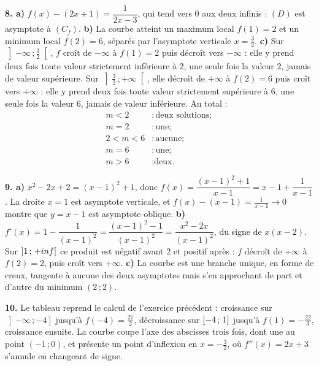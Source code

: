 \begin{corrige}[annales]
\textbf{8. a)} $f(x)-(2x+1) = \dfrac{1}{2x-3}$, qui tend vers $0$ aux deux
infinis : $(D)$ est asymptote à $(C_{f})$.
\textbf{b)} La courbe atteint un maximum local $f(1) = 2$ et un minimum local
$f(2) = 6$, séparés par l'asymptote verticale $x = \frac32$.
\textbf{c)} Sur $\left]-\infty\,;\frac32\right[$, $f$ croît de $-\infty$ à
$f(1) = 2$ puis décroît vers $-\infty$ : elle y prend deux fois toute valeur
strictement inférieure à $2$, une seule fois la valeur $2$, jamais de valeur
supérieure. Sur $\left]\frac32\,;+\infty\right[$, elle décroît de $+\infty$ à
$f(2) = 6$ puis croît vers $+\infty$ : elle y prend deux fois toute valeur
strictement supérieure à $6$, une seule fois la valeur $6$, jamais de valeur
inférieure. Au total :
\[\begin{aligned}
m<2 &: \text{deux solutions} ; \\
  m = 2 &: \text{une} ; \\
  2<m<6 &: \text{aucune} ; \\
  m = 6 &: \text{une} ; \\
  m>6 &: \text{deux.}
\end{aligned}\]

\textbf{9. a)} $x^{2}-2x+2 = (x-1)^{2}+1$, donc
$f(x) = \dfrac{(x-1)^{2}+1}{x-1} = x-1+\dfrac{1}{x-1}$. La droite $x = 1$ est
asymptote verticale, et $f(x)-(x-1) = \frac{1}{x-1}\to0$ montre que
$y = x-1$ est asymptote oblique.
\textbf{b)} $f'(x) = 1-\dfrac{1}{(x-1)^{2}} = \dfrac{(x-1)^{2}-1}{(x-1)^{2}}
= \dfrac{x^{2}-2x}{(x-1)^{2}}$, du signe de $x(x-2)$. Sur
$\left]1\,;\,+inf\right[$ ce produit est négatif avant $2$ et positif après :
$f$ décroît de $+\infty$ à $f(2) = 2$, puis croît vers $+\infty$.
\textbf{c)} La courbe est une branche unique, en forme de creux, tangente
à aucune des deux asymptotes mais s'en approchant de part et d'autre du
minimum $(2\,;2)$.

\textbf{10.} Le tableau reprend le calcul de l'exercice précédent :
croissance sur $\left]-\infty\,;-4\right]$ jusqu'à $f(-4) = \frac{27}{2}$,
décroissance sur $\left[-4\,;\,1\right]$ jusqu'à $f(1) = -\frac{22}{3}$,
croissance ensuite. La courbe coupe l'axe des abscisses trois fois, dont une
au point $(-1\,;0)$, et présente un point d'inflexion en
$x = -\frac32$, où $f''(x) = 2x+3$ s'annule en changeant de signe.
\end{corrige}

